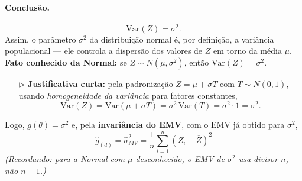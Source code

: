 \paragraph{Conclusão.}
\[
\boxed{\;\mathrm{Var}(Z)=\sigma^2.\;}
\]
Assim, o parâmetro $\sigma^2$ da distribuição normal é, por definição, a variância populacional — ele controla a dispersão dos valores de $Z$ em torno da média $\mu$.
\textbf{Fato conhecido da Normal:} se $Z\sim N(\mu,\sigma^2)$, então $\mathrm{Var}(Z)=\sigma^2$.
\begin{itemize}
  \item[\(\triangleright\)] \textbf{Justificativa curta:} pela padronização $Z=\mu+\sigma T$ com $T\sim N(0,1)$,
  usando \emph{homogeneidade da variância} para fatores constantes,
  \[
  \mathrm{Var}(Z)=\mathrm{Var}(\mu+\sigma T)=\sigma^2\,\mathrm{Var}(T)=\sigma^2\cdot 1=\sigma^2 .
  \]
\end{itemize}
Logo, $g(\theta)=\sigma^2$ e, pela \textbf{invariância do EMV}, com o EMV já obtido para $\sigma^2$,
\[
\boxed{\;\widehat g_{(d)}=\widehat\sigma^2_{MV}=\frac{1}{n}\sum_{i=1}^n (Z_i-\overline Z)^2\;}
\]
\emph{(Recordando: para a Normal com $\mu$ desconhecido, o EMV de $\sigma^2$ usa divisor $n$, não $n-1$.)}
